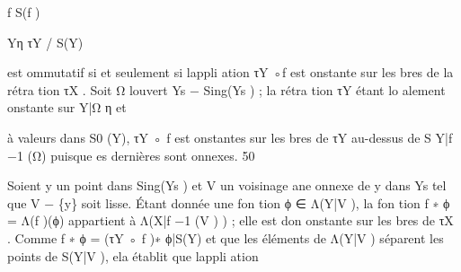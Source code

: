 \documentclass[
  10pt,
]{article}
\newenvironment{Shaded}{}{}
\newcommand{\NormalTok}[1]{#1}
\begin{document}
\begin{Shaded}
\begin{Highlighting}[]
\NormalTok{                                         f                    S(f )}
                                                         
\NormalTok{                                          Yη     τY}
\NormalTok{                                                      / S(Y)}

\NormalTok{est ommutatif si et seulement si l\textquotesingle{}appli ation τY ◦f est onstante sur les bres de la rétra tion}
\NormalTok{τX .                                                                                       }
\NormalTok{    Soit Ω l\textquotesingle{}ouvert Ys − Sing(Ys ) ; la rétra tion τY étant lo alement onstante sur Y|Ω η et}
                                                                                               
\NormalTok{     à valeurs dans S0 (Y), τY ◦ f est onstantes sur les bres de τY au{-}dessus de S Y|f −1 (Ω)}
\NormalTok{     puisque es dernières sont onnexes.}
\NormalTok{50}



\NormalTok{      Soient y un point dans Sing(Ys ) et V un voisinage ane onnexe de y dans Ys tel que}
\NormalTok{       V − \{y\} soit lisse. Étant donnée une fon tion ϕ ∈ Λ(Y|V ), la fon tion f ∗ ϕ = Λ(f )(ϕ)}
\NormalTok{       appartient à Λ(X|f −1 (V ) ) ; elle est don onstante sur les bres de τX . Comme}
\NormalTok{                                        f ∗ ϕ = (τY ◦ f )∗ ϕ|S(Y)}
\NormalTok{       et que les éléments de Λ(Y|V ) séparent les points de S(Y|V ), ela établit que l\textquotesingle{}appli ation}
                                                                          

\end{Highlighting}
\end{Shaded}
\end{document}
